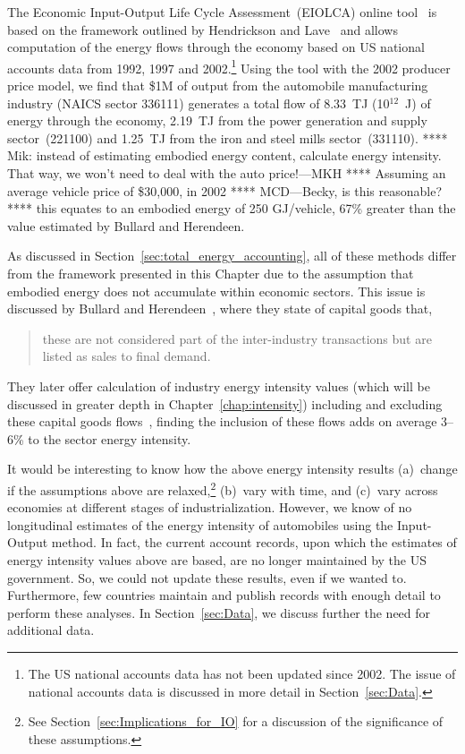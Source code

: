 The Economic Input-Output Life Cycle 
Assessment~(EIOLCA) online tool~\cite{EIOLCA2014} 
is based on the framework outlined
by Hendrickson and Lave~\cite{Hendrickson2006}
and allows computation of the energy flows through
the economy based on US national accounts data from 1992,
1997 and 2002.\footnote{The 
US national accounts
data has not been updated since 2002.
The issue of national accounts data is discussed in more
detail in Section~\ref{sec:Data}.}
Using the tool with the 2002 producer price model,
we find that \$1M of output
from the automobile manufacturing industry
(NAICS sector 336111) generates
a total flow of 8.33~TJ (10$^{12}$~J) of energy through the economy,
2.19~TJ from the power generation and 
supply sector~(221100) and 1.25~TJ from the
iron and steel mills sector~(331110).
**** Mik: instead of estimating embodied energy content, 
calculate energy intensity. 
That way, we won't need to deal with the auto price!---MKH ****
Assuming an average vehicle price of \$30,000,
in 2002 **** MCD---Becky, is this reasonable? ****
this equates to an embodied energy of
250 GJ/vehicle, 67\% greater than the value
estimated by Bullard and Herendeen.

As discussed in Section~\ref{sec:total_energy_accounting},
all of these methods differ from the framework presented
in this Chapter due to the assumption that embodied energy
does not accumulate within economic sectors.
This issue is discussed by 
Bullard and Herendeen~\cite[p.273]{Bullard1975},
where they state of capital goods that,

\begin{quote}
	these are not considered part of the 
	inter-industry transactions but are 
	listed as sales to final demand.
\end{quote}

They later offer calculation of industry
energy intensity values (which will be discussed
in greater depth in Chapter~\ref{chap:intensity})
including and excluding these capital goods
flows~\cite[p.489]{Bullard1975},
finding the inclusion of these flows adds
on average 3--6\% to the sector
energy intensity.

It would be interesting to know 
how the above energy intensity results 
(a)~change if the assumptions above are relaxed,\footnote{See 
Section~\ref{sec:Implications_for_IO} for a discussion
of the significance of these assumptions.}
(b)~vary with time, and 
(c)~vary across economies at different stages of industrialization.
However, we know of no longitudinal estimates of the energy intensity of automobiles
using the Input-Output method.
In fact, the current account records, upon which the estimates 
of energy intensity values above are based, are no longer
maintained by the US government. 
So, we could not update these results, even if we wanted to.
Furthermore, few countries maintain and publish records with enough detail
to perform these analyses.
In Section~\ref{sec:Data}, we discuss further the need for additional data.


